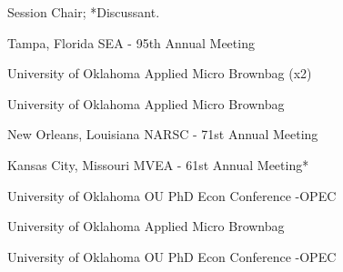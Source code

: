 \textdagger Session Chair; *Discussant.

{%
	Tampa, Florida}
{%
	SEA - 95th Annual Meeting}
{}

{%
	University of Oklahoma}
{%
	Applied Micro Brownbag (x2)}
{}

{%
	University of Oklahoma}
{%
	Applied Micro Brownbag}
{}

{%
	New Orleans, Louisiana}
{%
	NARSC - 71st Annual Meeting\ec}
{}

{%
	Kansas City, Missouri}
{%
	MVEA - 61st Annual Meeting*}
{}


{%
	University of Oklahoma}
{%
	OU PhD Econ Conference -OPEC}
{}

{%
	University of Oklahoma}
{%
	Applied Micro Brownbag}
{}

{%
	University of Oklahoma}
{%
	OU PhD Econ Conference -OPEC}
{}